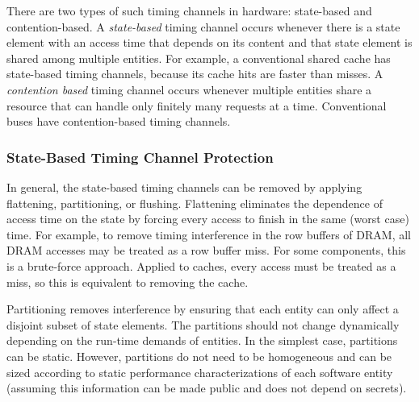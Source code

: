 There are two types of such timing channels in hardware: state-based
and contention-based.
A \emph{state-based} timing channel occurs whenever there is a state element 
with an access time that depends on its content and that state element is 
shared among multiple entities.
For example, a conventional shared cache has state-based timing channels, because 
its cache hits are faster than misses.
A \emph{contention based} timing channel occurs whenever multiple entities 
share a resource that can handle only finitely many requests at a time.
Conventional buses have contention-based timing channels.

\subsubsection{State-Based Timing Channel Protection}

In general, the state-based 
timing channels can be removed by applying flattening, partitioning, or 
flushing.
Flattening eliminates the dependence of access time on the state by forcing 
every access to finish in the same (worst case) time. For example, to remove timing 
interference in the row buffers of DRAM, all DRAM accesses may be treated as 
a row buffer miss.
For some components, this is a 
brute-force approach. Applied to caches, every access must be treated as a 
miss, so this is equivalent to removing the cache. 

Partitioning removes interference by ensuring that each entity can
only affect a disjoint subset of state elements. The partitions
should not change dynamically depending on the run-time demands of entities.
In the simplest case, partitions can be static.
However, partitions do not need to be homogeneous and can be sized according 
to static performance characterizations of each software entity (assuming this 
information can be made public and does not depend on secrets).


